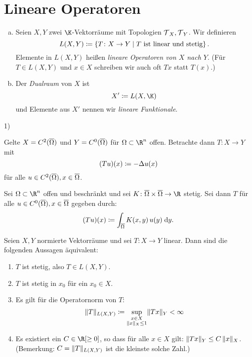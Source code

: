 \chapter{Lineare Operatoren}
\begin{thDef}\hfill
    \begin{enumerate}[a)]
        \item
            Seien $X,Y$ zwei $\K$-Vektorräume mit Topologien $\operatorname{\mathcal{T}}_X,\operatorname{\mathcal{T}}_Y$.
            Wir definieren 
            \[ L(X,Y) \defeq
                \left\{ T\colon X\to Y \Mid
                    T \text{ ist linear und stetig} 
                \right\}
            . \]
            Elemente in $L(X,Y)$ heißen \emph{lineare Operatoren von $X$ nach $Y$}.
            (Für $T\in L(X,Y)$ und $x\in X$ schreiben wir auch oft $Tx$ statt
            $T(x)$.)
            
        \item
            Der \emph{Dualraum} von $X$ ist
            \[ X' \defeq L(X,\K)  \]
            und Elemente aus $X'$ nennen wir \emph{lineare Funktionale}.
    \end{enumerate}
\end{thDef}

\begin{BspList}{1)}
\item
    Gelte $X=C^2(\overline{\Omega})$ und $Y=C^0(\overline{\Omega})$ für
    $\Omega\subset\R^n$ offen. Betrachte dann $T\colon X\to Y$ mit
    \[ (Tu)(x) \coloneqq -\Delta u(x) \]
    für alle $u\in C^2(\overline{\Omega}), x\in\overline{\Omega}$.
    
\item
    Sei $\Omega\subset\R^n$ offen und beschränkt und sei
    $K\colon\setclosure\Omega\times\setclosure\Omega \to \R$ stetig.
    Sei dann $T$ für alle $u\in C^0(\overline{\Omega}), x\in\overline{\Omega}$
    gegeben durch:
    \[ (Tu)(x) \coloneqq \int_{\overline{\Omega}} K(x,y)\, u(y) \;\mathrm{d} y  . \]
\end{BspList}

\begin{thLemma}
    Seien $X,Y$ normierte Vektorräume und sei $T\colon X\to Y$ linear. Dann sind
    die folgenden Aussagen äquivalent:
    \begin{enumerate}[(1)]
        \item \label{vl04:lemma3.3-1}
            $T$ ist stetig, also $T\in L(X,Y)$.
        \item \label{vl04:lemma3.3-2}
            $T$ ist stetig in $x_0$ für ein $x_0\in X$.
        \item \label{vl04:lemma3.3-3}
            Es gilt für die Operatornorm von $T$:\quad
            \[ \lVert T\rVert_{L(X,Y)} \coloneqq 
                \sup_{\substack{x\in X\\\lVert x\rVert_X\leq1}} \lVert Tx\rVert_Y < \infty
            \]
        \item \label{vl04:lemma3.3-4}
            Es existiert ein $C\in\R[\geq0]$, so dass für alle $x\in X$ gilt:
            $\lVert Tx\rVert_Y \leq C\,\lVert x\rVert_X$.
            (Bemerkung: $C = \lVert T\rVert_{L(X,Y)}$ ist die kleinste solche Zahl.)
    \end{enumerate}
\end{thLemma}

